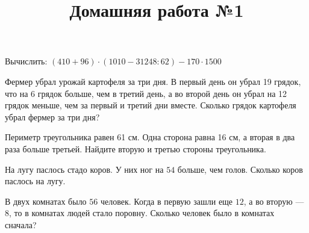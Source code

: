 \newpage
\title{Домашняя работа №1}
\begin{listofex}
	\item Вычислить: \( (410+96)\cdot(1010-31248:62)-170\cdot1500 \)
	\item Фермер убрал урожай картофеля за три дня. В первый день он убрал 19 грядок, что на 6 грядок больше, чем в третий день, а во второй день он убрал на 12 грядок меньше, чем за первый и третий дни вместе. Сколько грядок картофеля убрал фермер за три дня?
	\item Периметр треугольника равен 61 см. Одна сторона равна 16 см, а вторая в два раза больше третьей. Найдите вторую и третью стороны треугольника.
	\item На лугу паслось стадо коров. У них ног на \( 54 \) больше, чем голов. Сколько коров паслось на лугу.
	\item В двух комнатах было \( 56 \) человек. Когда в первую зашли еще \( 12 \), а во вторую --- \( 8 \), то в комнатах людей стало поровну. Сколько человек было в комнатах сначала?
\end{listofex}
\newpage

